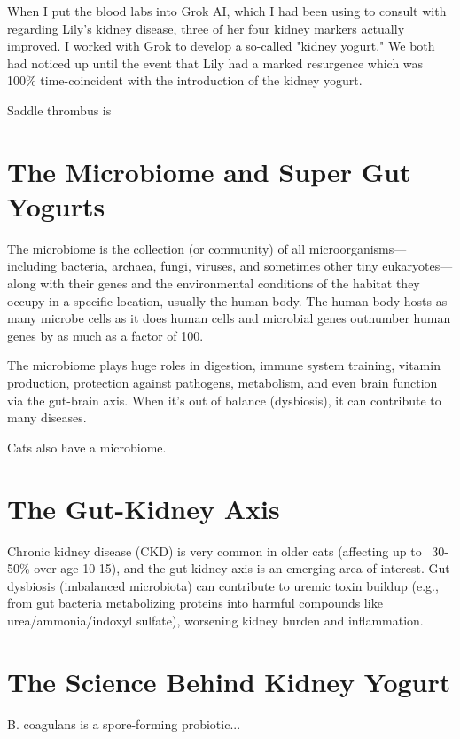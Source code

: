 \documentclass[twocolumn]{NobArticle}
\begin{document}
	When I put the blood labs into Grok AI, which I had been using to consult with regarding Lily's kidney disease, three of her four kidney markers actually improved. I worked with Grok to develop a so-called "kidney yogurt." We both had noticed up until the event that Lily had a marked resurgence which was 100\% time-coincident with the introduction of the kidney yogurt.
	
	
		
	Saddle thrombus is 
	
	
	
	
	
	\section{The Microbiome and Super Gut Yogurts}
	The microbiome is the collection (or community) of all microorganisms—including bacteria, archaea, fungi, viruses, and sometimes other tiny eukaryotes—along with their genes and the environmental conditions of the habitat they occupy in a specific location, usually the human body. The human body hosts as many microbe cells as it does human cells and microbial genes outnumber human genes by as much as a factor of 100. 
	
	The microbiome plays huge roles in digestion, immune system training, vitamin production, protection against pathogens, metabolism, and even brain function via the gut-brain axis. When it's out of balance (dysbiosis), it can contribute to many diseases.
	
	Cats also have a microbiome.
	
	\section{The Gut-Kidney Axis}
	Chronic kidney disease (CKD) is very common in older cats (affecting up to ~30-50\% over age 10-15), and the gut-kidney axis is an emerging area of interest. Gut dysbiosis (imbalanced microbiota) can contribute to uremic toxin buildup (e.g., from gut bacteria metabolizing proteins into harmful compounds like urea/ammonia/indoxyl sulfate), worsening kidney burden and inflammation.
		
	
		
	\section{The Science Behind Kidney Yogurt}
	B. coagulans is a spore-forming probiotic...
	
\end{document}
